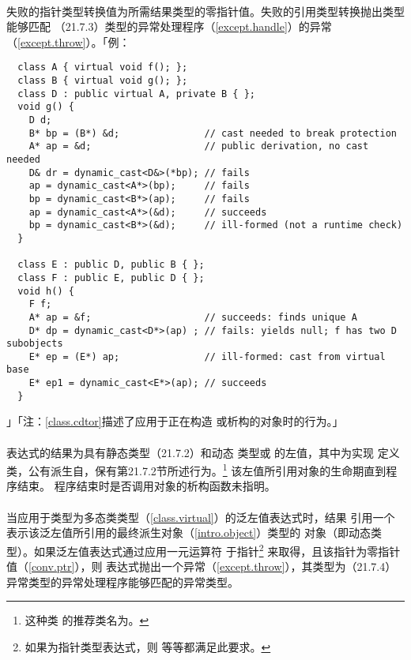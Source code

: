 \paragraph{}
失败的指针类型转换值为所需结果类型的零指针值。失败的引用类型转换抛出类型能够匹配
（21.7.3）类型的异常处理程序（\ref{except.handle}）的异常
（\ref{except.throw}）。「例：
\begin{lstlisting}
  class A { virtual void f(); };
  class B { virtual void g(); };
  class D : public virtual A, private B { };
  void g() {
    D d;
    B* bp = (B*) &d;               // cast needed to break protection
    A* ap = &d;                    // public derivation, no cast needed
    D& dr = dynamic_cast<D&>(*bp); // fails
    ap = dynamic_cast<A*>(bp);     // fails
    bp = dynamic_cast<B*>(ap);     // fails
    ap = dynamic_cast<A*>(&d);     // succeeds
    bp = dynamic_cast<B*>(&d);     // ill-formed (not a runtime check)
  }

  class E : public D, public B { };
  class F : public E, public D { };
  void h() {
    F f;
    A* ap = &f;                    // succeeds: finds unique A
    D* dp = dynamic_cast<D*>(ap) ; // fails: yields null; f has two D subobjects
    E* ep = (E*) ap;               // ill-formed: cast from virtual base
    E* ep1 = dynamic_cast<E*>(ap); // succeeds
  }
\end{lstlisting}」「注：\ref{class.cdtor}描述了应用于正在构造
或析构的对象时的行为。」

\paragraph{}
表达式的结果为具有静态类型（21.7.2）和动态
类型或 的左值，其中为实现
定义类，公有派生自，保有第21.7.2节所述行为。\footnote{这种类
的推荐类名为。} 该左值所引用对象的生命期直到程序结束。
程序结束时是否调用对象的析构函数未指明。

\paragraph{}
当应用于类型为多态类类型（\ref{class.virtual}）的泛左值表达式时，结果
引用一个表示该泛左值所引用的最终派生对象（\ref{intro.object}）类型的
对象（即动态类型）。如果泛左值表达式通过应用一元\tm{*}运算符
于指针\footnote{如果为指针类型表达式，则
等等都满足此要求。} 来取得，且该指针为零指针值（\ref{conv.ptr}），则
表达式抛出一个异常（\ref{except.throw}），其类型为（21.7.4）
异常类型的异常处理程序能够匹配的异常类型。

